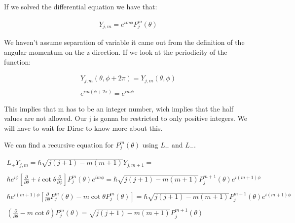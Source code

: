 If we solved the differential equation we have that:

\begin{equation}
  \begin{array}{c}
    Y_{j,m} = e^{im\phi}P_j^m(\theta)
  \end{array}
\end{equation}

We haven't assume separation of variable it came out from the definition of the angular momentum on the z direction. If we look at the periodicity of the function:

\begin{equation}
  \begin{array}{c}
    Y_{j,m}(\theta,\phi+2\pi) = Y_{j,m}(\theta,\phi)
    \\

    \\
    e^{im(\phi+2\pi)} = e^{im\phi}
  \end{array}
\end{equation}

This implies that m has to be an integer number, wich implies that the half values are not allowed. Our j is gonna be restricted to only positive integers. We will have to wait for Dirac to know more about this.

We can find a recursive equation for $P_j^m(\theta)$ using $L_+$ and $L_-$.

\begin{equation}
  \begin{array}{c}
    L_+ Y_{j,m} = \hbar \sqrt{j(j+1)-m(m+1)}Y_{j,m+1} =
    \\

    \\
    \hbar e^{i\phi}\left[\frac{\partial}{\partial \theta}+i\cot\theta\frac{\partial}{\partial \phi}\right]P_j^m(\theta)e^{im\phi} = \hbar\sqrt{j(j+1)-m(m+1)}P_j^{m+1}(\theta)e^{i(m+1)\phi}
    \\

    \\
    \hbar e^{i(m+1)\phi} \left[\frac{\partial}{\partial \theta}P_j^m(\theta) -m\cot{\theta}P_j^m(\theta)\right] = \hbar\sqrt{j(j+1)-m(m+1)}P_j^{m+1}(\theta)e^{i(m+1)\phi}
    \\

    \\
    \left(\frac{\partial}{\partial\theta}-m\cot\theta\right)P_j^m(\theta) = \sqrt{j(j+1)-m(m+1)}P_j^{m+1}(\theta)
  \end{array}
\end{equation}

